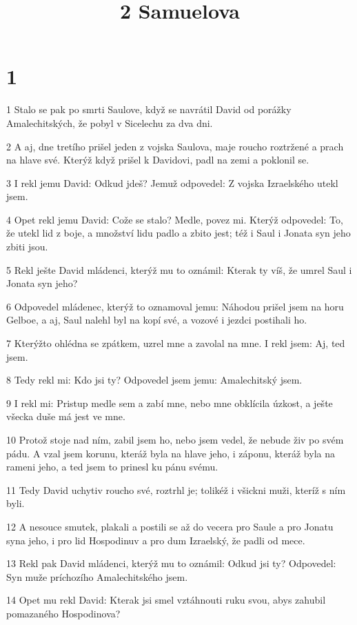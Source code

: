 

\title{2 Samuelova}

\chapter{1}

\par 1 Stalo se pak po smrti Saulove, když se navrátil David od porážky Amalechitských, že pobyl v Sicelechu za dva dni.
\par 2 A aj, dne tretího prišel jeden z vojska Saulova, maje roucho roztržené a prach na hlave své. Kterýž když prišel k Davidovi, padl na zemi a poklonil se.
\par 3 I rekl jemu David: Odkud jdeš? Jemuž odpovedel: Z vojska Izraelského utekl jsem.
\par 4 Opet rekl jemu David: Cože se stalo? Medle, povez mi. Kterýž odpovedel: To, že utekl lid z boje, a množství lidu padlo a zbito jest; též i Saul i Jonata syn jeho zbiti jsou.
\par 5 Rekl ješte David mládenci, kterýž mu to oznámil: Kterak ty víš, že umrel Saul i Jonata syn jeho?
\par 6 Odpovedel mládenec, kterýž to oznamoval jemu: Náhodou prišel jsem na horu Gelboe, a aj, Saul nalehl byl na kopí své, a vozové i jezdci postihali ho.
\par 7 Kterýžto ohlédna se zpátkem, uzrel mne a zavolal na mne. I rekl jsem: Aj, ted jsem.
\par 8 Tedy rekl mi: Kdo jsi ty? Odpovedel jsem jemu: Amalechitský jsem.
\par 9 I rekl mi: Pristup medle sem a zabí mne, nebo mne obklícila úzkost, a ješte všecka duše má jest ve mne.
\par 10 Protož stoje nad ním, zabil jsem ho, nebo jsem vedel, že nebude živ po svém pádu. A vzal jsem korunu, kteráž byla na hlave jeho, i záponu, kteráž byla na rameni jeho, a ted jsem to prinesl ku pánu svému.
\par 11 Tedy David uchytiv roucho své, roztrhl je; tolikéž i všickni muži, kteríž s ním byli.
\par 12 A nesouce smutek, plakali a postili se až do vecera pro Saule a pro Jonatu syna jeho, i pro lid Hospodinuv a pro dum Izraelský, že padli od mece.
\par 13 Rekl pak David mládenci, kterýž mu to oznámil: Odkud jsi ty? Odpovedel: Syn muže príchozího Amalechitského jsem.
\par 14 Opet mu rekl David: Kterak jsi smel vztáhnouti ruku svou, abys zahubil pomazaného Hospodinova?
